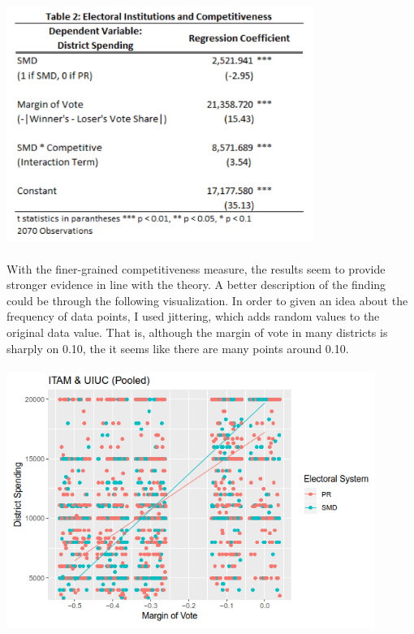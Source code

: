 \documentclass{article}
\begin{document}
\\
\includegraphics[width=100mm]{Regression_Fine}\\
\\
With the finer-grained competitiveness measure, the results seem to provide stronger evidence in line with the theory. A better description of the finding could be through the following visualization. In order to given an idea about the frequency of data points, I used jittering, which adds random values to the original data value. That is, although the margin of vote in many districts is sharply on 0.10, the it seems like there are many points around 0.10.\\
\\
\includegraphics[width=120mm]{Interactive_Pooled}
\end{document}
